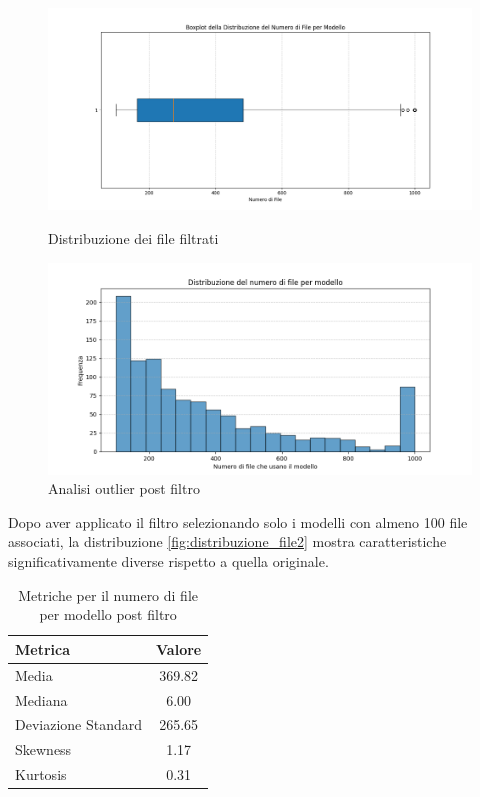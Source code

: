 \documentclass{article}
\begin{document}
\begin{figure}[h]
    \centering
    \begin{minipage}{0.45\textwidth}
        \centering
        \includegraphics[width=\linewidth]{img/approccio3.png}
        \caption{Distribuzione dei file filtrati}
        \label{fig:distribuzione_file2}
    \end{minipage}
    \hfill
    \begin{minipage}{0.45\textwidth}
        \centering
        \includegraphics[width=\linewidth]{img/approccio4.png}
        \caption{Analisi outlier post filtro}
        \label{fig:outlier_file2}
    \end{minipage}
\end{figure}
Dopo aver applicato il filtro selezionando solo i modelli con almeno 100 file associati, la distribuzione \ref{fig:distribuzione_file2} mostra caratteristiche significativamente diverse rispetto a quella originale.\\
\begin{table}[h]
    \centering
    \begin{tabular}{|l|c|}
        \hline
        \textbf{Metrica} & \textbf{Valore} \\
        \hline
        Media & 369.82 \\
        Mediana & 6.00 \\
        Deviazione Standard & 265.65 \\
        Skewness & 1.17 \\
        Kurtosis & 0.31 \\
        \hline
    \end{tabular}
    \caption{Metriche per il numero di file per modello post filtro}
    \label{tab:metriche_file_modello2}
\end{table}\\
\end{document}
